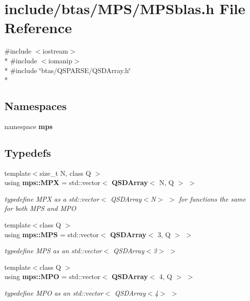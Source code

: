\section{include/btas/\-M\-P\-S/\-M\-P\-Sblas.h File Reference}
\label{de/d28/MPSblas_8h}
{\ttfamily \#include $<$iostream$>$}\\*
{\ttfamily \#include $<$iomanip$>$}\\*
{\ttfamily \#include \char`\"{}btas/\-Q\-S\-P\-A\-R\-S\-E/\-Q\-S\-D\-Array.\-h\char`\"{}}\\*
\subsection*{Namespaces}
\begin{DoxyCompactItemize}
\item 
namespace {\bf mps}
\end{DoxyCompactItemize}
\subsection*{Typedefs}
\begin{DoxyCompactItemize}
\item 
{\footnotesize template$<$size\-\_\-t N, class Q $>$ }\\using {\bf mps\-::\-M\-P\-X} = std\-::vector$<$ {\bf Q\-S\-D\-Array}$<$ N, Q $>$ $>$
\begin{DoxyCompactList}\small\item\em typedefine M\-P\-X as a std\-::vector$<$ Q\-S\-D\-Array$<$\-N$>$ $>$ for functions the same for both M\-P\-S and M\-P\-O \end{DoxyCompactList}\item 
{\footnotesize template$<$class Q $>$ }\\using {\bf mps\-::\-M\-P\-S} = std\-::vector$<$ {\bf Q\-S\-D\-Array}$<$ 3, Q $>$ $>$
\begin{DoxyCompactList}\small\item\em typedefine M\-P\-S as an std\-::vector$<$ Q\-S\-D\-Array$<$3$>$ $>$ \end{DoxyCompactList}\item 
{\footnotesize template$<$class Q $>$ }\\using {\bf mps\-::\-M\-P\-O} = std\-::vector$<$ {\bf Q\-S\-D\-Array}$<$ 4, Q $>$ $>$
\begin{DoxyCompactList}\small\item\em typedefine M\-P\-O as an std\-::vector$<$ Q\-S\-D\-Array$<$4$>$ $>$ \end{DoxyCompactList}\end{DoxyCompactItemize}
